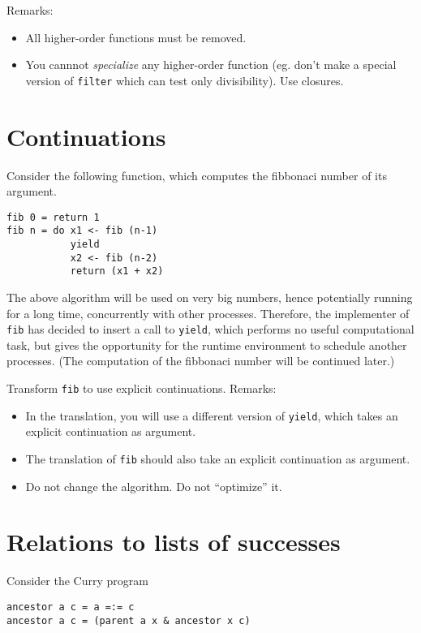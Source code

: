 \documentclass{article}
\begin{document}
Remarks:
\begin{itemize}
\item All higher-order functions must be removed.
\item You cannnot \emph{specialize} any higher-order function
  (eg. don't make a special version of \texttt{filter} which can test
  only divisibility).  Use closures.
\end{itemize}
\section{Continuations}

Consider the following function, which computes the fibbonaci number
of its argument.
\begin{verbatim}
fib 0 = return 1
fib n = do x1 <- fib (n-1)
           yield
           x2 <- fib (n-2)
           return (x1 + x2)
\end{verbatim}

The above algorithm will be used on very big numbers, hence
potentially running for a long time, concurrently with other
processes. Therefore, the implementer of \texttt{fib} has decided to
insert a call to \texttt{yield}, which performs no useful
computational task, but gives the opportunity for the runtime
environment to schedule another processes. (The computation of the
fibbonaci number will be continued later.)

Transform \texttt{fib} to use explicit continuations. Remarks: 
\begin{itemize}
\item In the translation, you will use a different version of
  \texttt{yield}, which takes an explicit continuation as argument.
\item The translation of \texttt{fib} should also take an explicit
  continuation as argument.
\item Do not change the algorithm. Do not ``optimize'' it.
\end{itemize}

\newpage
\section{Relations to lists of successes}

Consider the Curry program
\begin{verbatim}
ancestor a c = a =:= c
ancestor a c = (parent a x & ancestor x c) 
\end{verbatim}
\end{document}
